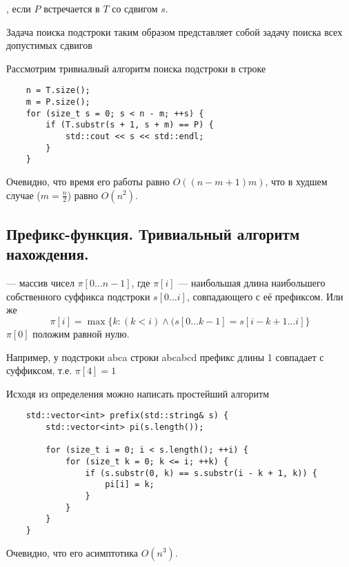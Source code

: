 \begin{definition}
	, если $P$ встречается в $T$ со сдвигом $s$.
\end{definition}

\begin{remark}
	Задача поиска подстроки таким образом представляет собой задачу поиска всех допустимых сдвигов
\end{remark}

Рассмотрим тривиалный алгоритм поиска подстроки в строке

\begin{lstlisting}
	n = T.size();
	m = P.size();
	for (size_t s = 0; s < n - m; ++s) {
		if (T.substr(s + 1, s + m) == P) {
			std::cout << s << std::endl;
		}
	}
\end{lstlisting}

\begin{remark}
	Очевидно, что время его работы равно $O((n - m + 1)m)$, что в худшем случае ($m = \frac{n}{2}$) равно
	$O(n^2)$.
\end{remark}

\subsection{Префикс-функция. Тривиальный алгоритм нахождения.}

\begin{definition}
	 --- массив чисел $\pi [0 \ldots n-1]$, где $\pi [i]$ --- наибольшая длина наибольшего
	собственного суффикса подстроки $s[0 \ldots i]$, совпадающего с её префиксом. Или же
	 \[
		 \pi[i] = \max \{ k \colon (k < i) \wedge (s[0 \ldots k-1] = s[i - k + 1 \ldots i] \}
	\]
	$\pi[0]$ положим равной нулю.
\end{definition}

Например, у подстроки abca строки abcabcd префикс длины 1 совпадает с суффиксом, т.е. $\pi [4] = 1$

Исходя из определения можно написать простейший алгоритм

\begin{lstlisting}
	std::vector<int> prefix(std::string& s) {
		std::vector<int> pi(s.length());

		for (size_t i = 0; i < s.length(); ++i) {
			for (size_t k = 0; k <= i; ++k) {
				if (s.substr(0, k) == s.substr(i - k + 1, k)) {
					pi[i] = k;
				}
			}
		}
	}
\end{lstlisting}

\begin{remark}
	Очевидно, что его асимптотика $O(n^3)$.
\end{remark}

